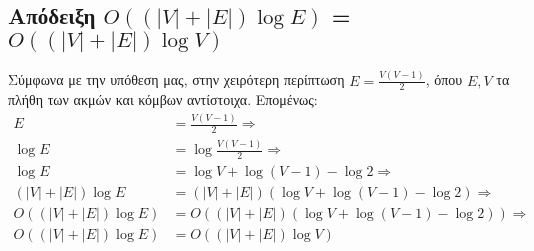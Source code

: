 \documentclass{article}
\begin{document}
\subsection*{Απόδειξη $ O((|V|+|E|)\log{E}) $ = $ O((|V|+|E|)\log{V}) $}
Σύμφωνα με την υπόθεση μας, στην χειρότερη περίπτωση $E = \frac{V(V-1)}{2}$, όπου $E,V$ τα πλήθη των ακμών και κόμβων αντίστοιχα. Επομένως:
\begin{align*}
    E &= \frac{V(V-1)}{2} \Rightarrow \\
    \log{E} &= \log{\frac{V(V-1)}{2}} \Rightarrow \\
    \log{E} &= \log{V} + \log{(V-1)} - \log{2} \Rightarrow \\
    (|V|+|E|)\log{E} &= (|V|+|E|)(\log{V} + \log{(V-1)} - \log{2}) \Rightarrow \\
    O((|V|+|E|)\log{E}) &= O((|V|+|E|)(\log{V} + \log{(V-1)} - \log{2})) \Rightarrow \\
    O((|V|+|E|)\log{E}) &= O((|V|+|E|)\log{V})
\end{align*}

\printbibliography
\end{document}
